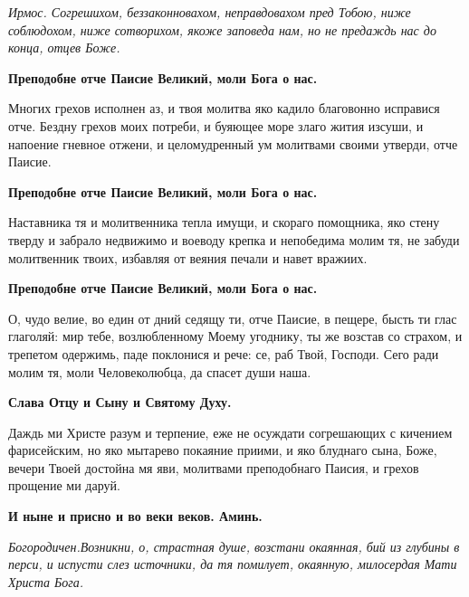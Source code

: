 



\itshape Ирмос.\normalfont{} Согрешихом, беззаконновахом, неправдовахом пред Тобою, ниже соблюдохом, ниже сотворихом, якоже заповеда нам, но не предаждь нас до конца, отцев Боже. 




\bfseries Преподобне отче Паисие Великий, моли Бога о нас.\normalfont{}




Многих грехов исполнен аз, и твоя молитва яко кадило благовонно исправися отче. Бездну грехов моих потреби, и буяющее море злаго жития изсуши, и напоение гневное отжени, и целомудренный ум молитвами своими утверди, отче Паисие. 




\bfseries Преподобне отче Паисие Великий, моли Бога о нас.\normalfont{}


Наставника тя и молитвенника тепла имущи, и скораго помощника, яко стену тверду и забрало недвижимо и воеводу крепка и непобедима молим тя, не забуди молитвенник твоих, избавляя от веяния печали и навет вражиих. 




\bfseries Преподобне отче Паисие Великий, моли Бога о нас.\normalfont{}


О, чудо велие, во един от дний седящу ти, отче Паисие, в пещере, бысть ти глас глаголяй: мир тебе, возлюбленному Моему угоднику, ты же возстав со страхом, и трепетом одержимь, паде поклонися и рече: се, раб Твой, Господи. Сего ради молим тя, моли Человеколюбца, да спасет души наша. 




\bfseries Слава Отцу и Сыну и Святому Духу.\normalfont{} 




Даждь ми Христе разум и терпение, еже не осуждати согрешающих с кичением фарисейским, но яко мытарево покаяние приими, и яко блуднаго сына, Боже, вечери Твоей достойна мя яви, молитвами преподобнаго Паисия, и грехов прощение ми даруй.




\bfseries И ныне и присно и во веки веков. Аминь.\normalfont{} 




\itshape Богородичен.\normalfont{}Возникни, о, страстная душе, возстани окаянная, бий из глубины в перси, и испусти слез источники, да тя помилует, окаянную, милосердая Мати Христа Бога. 




